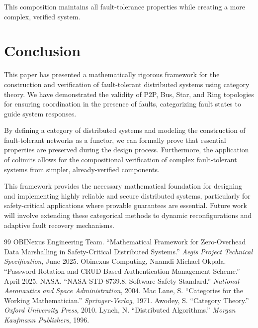 \documentclass{article}
\begin{document}
This composition maintains all fault-tolerance properties while creating a more complex, verified system.

\section{Conclusion}

This paper has presented a mathematically rigorous framework for the construction and verification of fault-tolerant distributed systems using category theory. We have demonstrated the validity of P2P, Bus, Star, and Ring topologies for ensuring coordination in the presence of faults, categorizing fault states to guide system responses.

By defining a category of distributed systems and modeling the construction of fault-tolerant networks as a functor, we can formally prove that essential properties are preserved during the design process. Furthermore, the application of colimits allows for the compositional verification of complex fault-tolerant systems from simpler, already-verified components.

This framework provides the necessary mathematical foundation for designing and implementing highly reliable and secure distributed systems, particularly for safety-critical applications where provable guarantees are essential. Future work will involve extending these categorical methods to dynamic reconfigurations and adaptive fault recovery mechanisms.


\begin{thebibliography}{99}
 OBINexus Engineering Team. ``Mathematical Framework for Zero-Overhead Data Marshalling in Safety-Critical Distributed Systems.'' \textit{Aegis Project Technical Specification}, June 2025.
 Obinexus Computing, Nnamdi Michael Okpala. ``Password Rotation and CRUD-Based Authentication Management Scheme.'' April 2025.
 NASA. ``NASA-STD-8739.8, Software Safety Standard.'' \textit{National Aeronautics and Space Administration}, 2004.
 Mac Lane, S. ``Categories for the Working Mathematician.'' \textit{Springer-Verlag}, 1971.
 Awodey, S. ``Category Theory.'' \textit{Oxford University Press}, 2010.
 Lynch, N. ``Distributed Algorithms.'' \textit{Morgan Kaufmann Publishers}, 1996.
\end{thebibliography}
\end{document}

